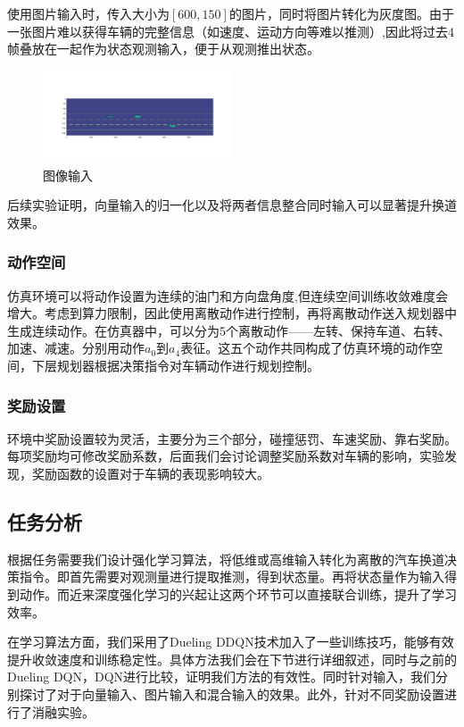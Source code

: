 \documentclass[letterpaper, 10 pt, conference]{ieeeconf}  %
\begin{document}
使用图片输入时，传入大小为$[600,150]$的图片，同时将图片转化为灰度图。由于一张图片难以获得车辆的完整信息（如速度、运动方向等难以推测）,因此将过去4帧叠放在一起作为状态观测输入，便于从观测推出状态。

\begin{figure}[htb] %
    \centering %
    \includegraphics[width=0.5\textwidth]{fig/1.png} %
    \caption{图像输入} %
    \label{Fig.main1} %
\end{figure}

后续实验证明，向量输入的归一化以及将两者信息整合同时输入可以显著提升换道效果。

\subsubsection{动作空间}
仿真环境可以将动作设置为连续的油门和方向盘角度,但连续空间训练收敛难度会增大。考虑到算力限制，因此使用离散动作进行控制，再将离散动作送入规划器中生成连续动作。在仿真器中，可以分为5个离散动作——左转、保持车道、右转、加速、减速。分别用动作$a_0$到$a_4$表征。这五个动作共同构成了仿真环境的动作空间，下层规划器根据决策指令对车辆动作进行规划控制。

\subsubsection{奖励设置}
环境中奖励设置较为灵活，主要分为三个部分，碰撞惩罚、车速奖励、靠右奖励。每项奖励均可修改奖励系数，后面我们会讨论调整奖励系数对车辆的影响，实验发现，奖励函数的设置对于车辆的表现影响较大。

\subsection{任务分析}
根据任务需要我们设计强化学习算法，将低维或高维输入转化为离散的汽车换道决策指令。即首先需要对观测量进行提取推测，得到状态量。再将状态量作为输入得到动作。而近来深度强化学习的兴起让这两个环节可以直接联合训练，提升了学习效率。

在学习算法方面，我们采用了Dueling DDQN技术加入了一些训练技巧，能够有效提升收敛速度和训练稳定性。具体方法我们会在下节进行详细叙述，同时与之前的Dueling DQN，DQN进行比较，证明我们方法的有效性。同时针对输入，我们分别探讨了对于向量输入、图片输入和混合输入的效果。此外，针对不同奖励设置进行了消融实验。
\end{document}
